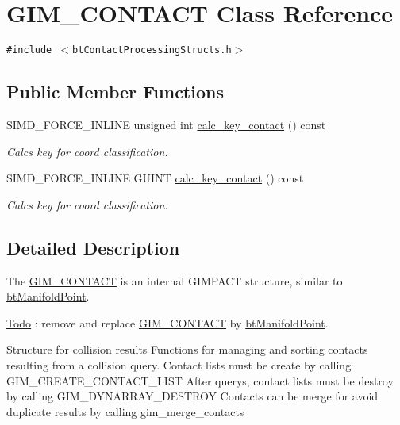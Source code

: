 \hypertarget{class_g_i_m___c_o_n_t_a_c_t}{
\section{GIM\_\-CONTACT Class Reference}
\label{class_g_i_m___c_o_n_t_a_c_t}
}
{\tt \#include $<$btContactProcessingStructs.h$>$}

\subsection*{Public Member Functions}
\begin{CompactItemize}
\item 
\hypertarget{class_g_i_m___c_o_n_t_a_c_t_61fafe1bf77bfc847c7fedee96ce215f}{
SIMD\_\-FORCE\_\-INLINE unsigned int \hyperlink{class_g_i_m___c_o_n_t_a_c_t_61fafe1bf77bfc847c7fedee96ce215f}{calc\_\-key\_\-contact} () const }
\label{class_g_i_m___c_o_n_t_a_c_t_61fafe1bf77bfc847c7fedee96ce215f}

\begin{CompactList}\small\item\em Calcs key for coord classification. \item\end{CompactList}\item 
\hypertarget{class_g_i_m___c_o_n_t_a_c_t_d8110f809b61009ed8424e25f7ae9f78}{
SIMD\_\-FORCE\_\-INLINE GUINT \hyperlink{class_g_i_m___c_o_n_t_a_c_t_d8110f809b61009ed8424e25f7ae9f78}{calc\_\-key\_\-contact} () const }
\label{class_g_i_m___c_o_n_t_a_c_t_d8110f809b61009ed8424e25f7ae9f78}

\begin{CompactList}\small\item\em Calcs key for coord classification. \item\end{CompactList}\end{CompactItemize}


\subsection{Detailed Description}
The \hyperlink{class_g_i_m___c_o_n_t_a_c_t}{GIM\_\-CONTACT} is an internal GIMPACT structure, similar to \hyperlink{classbt_manifold_point}{btManifoldPoint}. \begin{Desc}
\item[\hyperlink{todo__todo000025}{Todo}]: remove and replace \hyperlink{class_g_i_m___c_o_n_t_a_c_t}{GIM\_\-CONTACT} by \hyperlink{classbt_manifold_point}{btManifoldPoint}. \end{Desc}
Structure for collision results Functions for managing and sorting contacts resulting from a collision query. Contact lists must be create by calling GIM\_\-CREATE\_\-CONTACT\_\-LIST After querys, contact lists must be destroy by calling GIM\_\-DYNARRAY\_\-DESTROY Contacts can be merge for avoid duplicate results by calling gim\_\-merge\_\-contacts 

